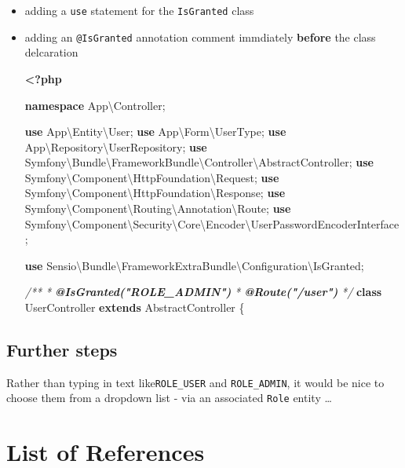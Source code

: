 \documentclass[a4paperpaper,openright]{book}
\newenvironment{Shaded}{}{}
\newcommand{\AnnotationTok}[1]{\textcolor[rgb]{0.38,0.63,0.69}{\textbf{\textit{#1}}}}
\newcommand{\CommentTok}[1]{\textcolor[rgb]{0.38,0.63,0.69}{\textit{#1}}}
\newcommand{\KeywordTok}[1]{\textcolor[rgb]{0.00,0.44,0.13}{\textbf{#1}}}
\newcommand{\NormalTok}[1]{#1}
\newcommand{\OtherTok}[1]{\textcolor[rgb]{0.00,0.44,0.13}{#1}}
\begin{document}
\begin{itemize}
\item
  adding a \texttt{use} statement for the \texttt{IsGranted} class
\item
  adding an \texttt{@IsGranted} annotation comment immdiately
  \textbf{before} the class delcaration

\begin{Shaded}
\begin{Highlighting}[]
\KeywordTok{<?php}

\KeywordTok{namespace}\NormalTok{ App\textbackslash{}Controller}\OtherTok{;}

\KeywordTok{use}\NormalTok{ App\textbackslash{}Entity\textbackslash{}User}\OtherTok{;}
\KeywordTok{use}\NormalTok{ App\textbackslash{}Form\textbackslash{}UserType}\OtherTok{;}
\KeywordTok{use}\NormalTok{ App\textbackslash{}Repository\textbackslash{}UserRepository}\OtherTok{;}
\KeywordTok{use}\NormalTok{ Symfony\textbackslash{}Bundle\textbackslash{}FrameworkBundle\textbackslash{}Controller\textbackslash{}AbstractController}\OtherTok{;}
\KeywordTok{use}\NormalTok{ Symfony\textbackslash{}Component\textbackslash{}HttpFoundation\textbackslash{}Request}\OtherTok{;}
\KeywordTok{use}\NormalTok{ Symfony\textbackslash{}Component\textbackslash{}HttpFoundation\textbackslash{}Response}\OtherTok{;}
\KeywordTok{use}\NormalTok{ Symfony\textbackslash{}Component\textbackslash{}Routing\textbackslash{}Annotation\textbackslash{}Route}\OtherTok{;}
\KeywordTok{use}\NormalTok{ Symfony\textbackslash{}Component\textbackslash{}Security\textbackslash{}Core\textbackslash{}Encoder\textbackslash{}UserPasswordEncoderInterface}\OtherTok{;}

\KeywordTok{use}\NormalTok{ Sensio\textbackslash{}Bundle\textbackslash{}FrameworkExtraBundle\textbackslash{}Configuration\textbackslash{}IsGranted}\OtherTok{;}


\CommentTok{/**}
\CommentTok{ * }\AnnotationTok{@IsGranted("ROLE_ADMIN")}
\CommentTok{ * }\AnnotationTok{@Route("/user")}
\CommentTok{ */}
\KeywordTok{class}\NormalTok{ UserController }\KeywordTok{extends}\NormalTok{ AbstractController}
\NormalTok{\{}
\end{Highlighting}
\end{Shaded}
\end{itemize}

\hypertarget{further-steps}{%
\section{Further steps}\label{further-steps}}

Rather than typing in text like\texttt{ROLE\_USER} and
\texttt{ROLE\_ADMIN}, it would be nice to choose them from a dropdown
list - via an associated \texttt{Role} entity \ldots{} \backmatter

\hypertarget{list-of-references}{%
\chapter{List of References}\label{list-of-references}}
\end{document}
